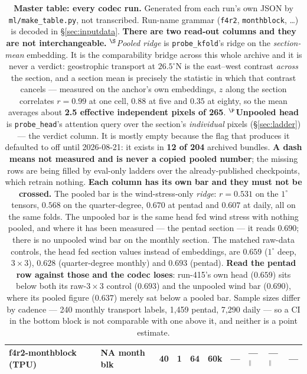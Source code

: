 \documentclass[10pt]{article}
\begin{document}
\begin{table}[p]
\begin{tabular}{llrrrrrlll}
f4r2-monthblock (TPU) & NA month blk & 40 & 1 & 64 & 60k & --- & ---$^\parallel$ & ---$^\parallel$ & --- \\
\bottomrule
\end{tabular}
\caption{\textbf{Master table: every codec run.} Generated from each
run's own JSON by \texttt{ml/make\_table.py}, not transcribed. Run-name
grammar (\texttt{f4r2}, \texttt{monthblock}, \dots) is decoded in
\S\ref{sec:inputdata}.
\textbf{There are two read-out columns and they are not interchangeable.}
$^\S$\emph{Pooled ridge} is \texttt{probe\_kfold}'s ridge on the
\emph{section-mean} embedding. It is the comparability bridge across this
whole archive and it is never a verdict: geostrophic transport at
$26.5^\circ$N is the east--west contrast \emph{across} the section, and a
section mean is precisely the statistic in which that contrast cancels ---
measured on the anchor's own embeddings, $z$ along the section correlates
$r=0.99$ at one cell, $0.88$ at five and $0.35$ at eighty, so the mean
averages about \textbf{2.5 effective independent pixels of 265}.
$^\P$\textbf{Unpooled head} is \texttt{probe\_head}'s attention query over
the section's \emph{individual} pixels (\S\ref{sec:ladder}) --- the
verdict column. It is mostly empty because the flag that produces it
defaulted to off until 2026-08-21: it exists in \textbf{12 of 204}
archived bundles. \textbf{A dash means not measured and is never a copied
pooled number}; the missing rows are being filled by eval-only ladders
over the already-published checkpoints, which retrain nothing.
\textbf{Each column has its own bar and they must not be crossed.} The
pooled bar is the wind-stress-only \emph{ridge}: $r=0.531$ on the
$1^\circ$ tensors, $0.568$ on the quarter-degree, $0.670$ at pentad and
$0.607$ at daily, all on the same folds. The unpooled bar is the same head
fed wind stress with nothing pooled, and where it has been measured ---
the pentad section --- it reads $0.690$; there is no unpooled wind bar on
the monthly section. The matched raw-data controls, the head fed section
values instead of embeddings, are $0.659$ ($1^\circ$ deep, $3\times3$),
$0.628$ (quarter-degree monthly) and $0.693$ (pentad). \textbf{Read the
pentad row against those and the codec loses}: run-415's own head
($0.659$) sits below both its raw-$3\times3$ control ($0.693$) and the
unpooled wind bar ($0.690$), where its pooled figure ($0.637$) merely sat
below a pooled bar. Sample sizes differ by cadence --- 240 monthly
transport labels, 1{,}459 pentad, 7{,}290 daily --- so a CI in the bottom
block is not comparable with one above it, and neither is a point estimate.
}
\end{table}
\end{document}
